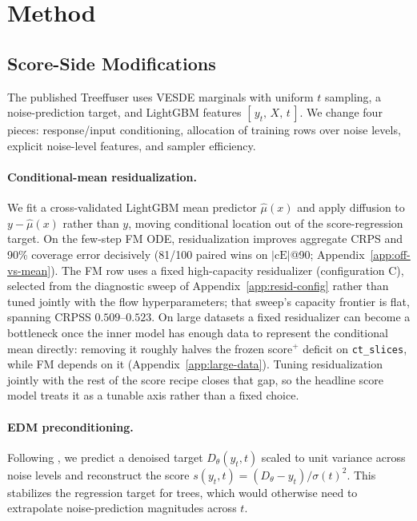 \documentclass{article}
\begin{document}
\section{Method}\label{sec:method}

\subsection{Score-Side Modifications}\label{sec:score-side}
The published Treeffuser uses VESDE marginals with uniform $t$ sampling, a noise-prediction target, and LightGBM features $[\,y_t,\,X,\,t\,]$. We change four pieces: response/input conditioning, allocation of training rows over noise levels, explicit noise-level features, and sampler efficiency.

\paragraph{Conditional-mean residualization.} We fit a cross-validated LightGBM mean predictor $\hat{\mu}(x)$ and apply diffusion to $y - \hat{\mu}(x)$ rather than $y$, moving conditional location out of the score-regression target. On the few-step FM ODE, residualization improves aggregate CRPS and 90\% coverage error decisively (81/100 paired wins on $|\text{cE}|$@90; Appendix~\ref{app:off-vs-mean}). The FM row uses a fixed high-capacity residualizer (configuration C), selected from the diagnostic sweep of Appendix~\ref{app:resid-config} rather than tuned jointly with the flow hyperparameters; that sweep's capacity frontier is flat, spanning CRPSS $0.509$--$0.523$. On large datasets a fixed residualizer can become a bottleneck once the inner model has enough data to represent the conditional mean directly: removing it roughly halves the frozen score$^+$ deficit on \texttt{ct\_slices}, while FM depends on it (Appendix~\ref{app:large-data}). Tuning residualization jointly with the rest of the score recipe closes that gap, so the headline score model treats it as a tunable axis rather than a fixed choice.

\paragraph{EDM preconditioning.} Following \citet{karras2022edm}, we predict a denoised target $D_\theta(y_t, t)$ scaled to unit variance across noise levels and reconstruct the score $s(y_t, t) = (D_\theta - y_t)/\sigma(t)^2$. This stabilizes the regression target for trees, which would otherwise need to extrapolate noise-prediction magnitudes across $t$.
\end{document}
